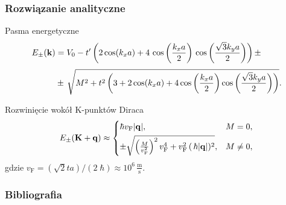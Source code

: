 \documentclass[10pt,t]{beamer}
\begin{document}
\begin{frame}
  \frametitle{Rozwiązanie analityczne}


  Pasma energetyczne
  \begin{equation}
    \begin{split}
      E_{ \pm }( \mathbf{k} )
      &=
        V_{ 0 } - t' \left( 2 \cos( k_{ x } a )
        + 4 \, \cos\left( \frac{ k_{ x } a }{ 2 } \right) \,
        \cos\left( \frac{ \sqrt{ 3 } k_{ y } a }{ 2 } \right)
        \right) \pm \\[0.3em]
      &\pm \, \sqrt{ M^{ 2 } + t^{ 2 } \left( 3 + 2 \cos( k_{ x } a )
        + 4 \cos\left( \frac{ k_{ x } a }{ 2 } \right)
        \cos\left( \frac{ \sqrt{ 3 } k_{ y } a }{ 2 } \right) \right) }.
    \end{split}
  \end{equation}

  Rozwinięcie wokół K-punktów Diraca
  \begin{equation}
    E_{ \pm }( \mathbf{K} + \mathbf{q} ) \approx
    \begin{cases}
      \hbar v_{ \textrm{F} } | \mathbf{q} |, & M = 0, \\[0.3em]
      \pm\sqrt{ \left( \frac{ M }{ v_{ \textrm{F} }^{ 2 } } \right)^{ 2 }
      v_{ \textrm{F} }^{ 4 }
      + v_{ \textrm{F} }^{ 2 } \, ( \, \hbar | \mathbf{q} | )^{ 2 } }, & M \neq 0,
    \end{cases}
  \end{equation}
  gdzie $v_{ \textrm{F} } = ( \sqrt{ 2 } t a ) / ( 2 \; \hbar ) \approx 10^{ 6 } \,
  \frac{ \textrm{m} }{ \textrm{s} }$.

\end{frame}










\appendix















\begin{frame}
  \frametitle{Bibliografia}


  

  {}

\end{frame}






\end{document}

